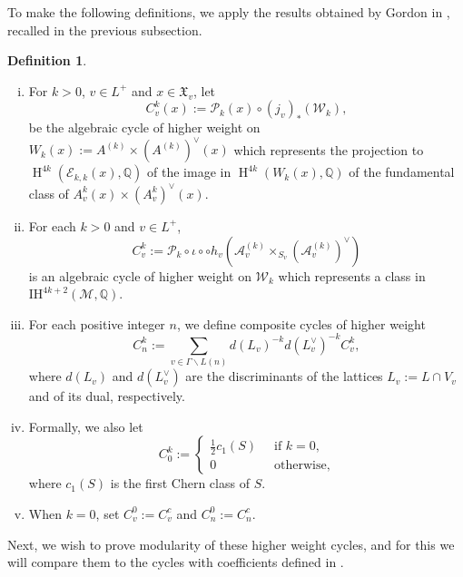 \documentclass[12pt,a4paper,reqno]{amsart}
\theoremstyle{definition}
\newtheorem{definition}{Definition}
\numberwithin{definition}{subsection}
\theoremstyle{definition}
\numberwithin{Definition}{subsection}
\theoremstyle{remark}
\theoremstyle{remark}
\numberwithin{Remark}{subsection}
\theoremstyle{remark}
\theoremstyle{plain}
\numberwithin{Theorem}{subsection}
\theoremstyle{plain}
\theoremstyle{plain}
\theoremstyle{plain}
\theoremstyle{plain}
\theoremstyle{plain}
\theoremstyle{plain}
\theoremstyle{plain}
\newcommand*{\Q}{\mathbb{Q}}
\DeclareMathOperator{\h}{H}
\begin{document}
To make the following definitions, we apply the results obtained by Gordon in \cite{gordon2}, recalled in the previous subsection.
\begin{definition}
\begin{enumerate}[(i)]
\item For $k>0$, $v\in L^+$ and $x\in \mathfrak{X}_v$, let
\[
C_v^k(x):=\mathcal{P}_k(x)\circ (j_v)_*(\mathcal{W}_k),
\]
be the algebraic cycle of higher weight on $W_k(x):=A^{(k)}\times (A^{(k)})^\vee(x)$ which represents the projection to $\h^{4k}(\mathcal{E}_{k,k}(x),\Q)$ of the image in $\h^{4k}(W_k(x),\Q)$ of the fundamental class of $A_v^k(x)\times (A_v^k)^\vee(x)$.
\item For each $k>0$ and $v\in L^+$,
\[
C_v^k:=\mathcal{P}_k\circ\iota\circ\circ h_v(\mathcal{A}_v^{(k)}\times_{S_v}(\mathcal{A}_v^{(k)})^\vee)
\]
is an algebraic cycle of higher weight on $\mathcal{W}_k$ which represents a class in $\text{IH}^{4k+2}(\mathcal{M},\Q)$.
\item For each positive integer $n$, we define composite cycles of higher weight 
\[
C_n^k:=\sum_{v\in \Gamma\backslash L(n)} d(L_v)^{-k}d(L_v^\vee)^{-k}C_v^k,
\]
where $d(L_v)$ and $d(L_v^\vee)$ are the discriminants of the lattices $L_v:=L\cap V_v$ and of its dual, respectively.
\item Formally, we also let
\[
C_0^k:=\begin{cases}
\frac{1}{2}c_1(S)\;\; &\text{if } k=0,\\
0\;\; &\text{otherwise},
\end{cases}
\]
where $c_1(S)$ is the first Chern class of $S$.
\item When $k=0$, set $C^0_v:=C_v^c$ and $C^0_n:=C_n^c$.
\end{enumerate}
\end{definition}

Next, we wish to prove modularity of these higher weight cycles, and for this we will compare them to the cycles with coefficients defined in \cite[p. 51]{little}.
\end{document}
